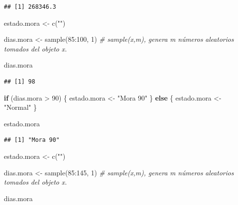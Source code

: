 \documentclass[
  12pt,
]{book}
\newenvironment{Shaded}{\begin{snugshade}}{\end{snugshade}}
\newcommand{\CommentTok}[1]{\textcolor[rgb]{0.56,0.35,0.01}{\textit{#1}}}
\newcommand{\ControlFlowTok}[1]{\textcolor[rgb]{0.13,0.29,0.53}{\textbf{#1}}}
\newcommand{\DecValTok}[1]{\textcolor[rgb]{0.00,0.00,0.81}{#1}}
\newcommand{\FunctionTok}[1]{\textcolor[rgb]{0.00,0.00,0.00}{#1}}
\newcommand{\NormalTok}[1]{#1}
\newcommand{\OtherTok}[1]{\textcolor[rgb]{0.56,0.35,0.01}{#1}}
\newcommand{\SpecialCharTok}[1]{\textcolor[rgb]{0.00,0.00,0.00}{#1}}
\newcommand{\StringTok}[1]{\textcolor[rgb]{0.31,0.60,0.02}{#1}}
\begin{document}
\begin{verbatim}
## [1] 268346.3
\end{verbatim}

\begin{Shaded}
\begin{Highlighting}[]
\NormalTok{estado.mora }\OtherTok{\textless{}{-}} \FunctionTok{c}\NormalTok{(}\StringTok{""}\NormalTok{)}

\NormalTok{dias.mora }\OtherTok{\textless{}{-}} \FunctionTok{sample}\NormalTok{(}\DecValTok{85}\SpecialCharTok{:}\DecValTok{100}\NormalTok{, }\DecValTok{1}\NormalTok{) }\CommentTok{\# sample(x,m), genera m números aleatorios tomados del objeto x.}

\NormalTok{dias.mora}
\end{Highlighting}
\end{Shaded}

\begin{verbatim}
## [1] 98
\end{verbatim}

\begin{Shaded}
\begin{Highlighting}[]
\ControlFlowTok{if}\NormalTok{ (dias.mora }\SpecialCharTok{\textgreater{}} \DecValTok{90}\NormalTok{) \{}
\NormalTok{  estado.mora }\OtherTok{\textless{}{-}} \StringTok{"Mora 90"}
\NormalTok{\} }\ControlFlowTok{else}\NormalTok{ \{}
\NormalTok{  estado.mora }\OtherTok{\textless{}{-}} \StringTok{"Normal"}
\NormalTok{\}}

\NormalTok{estado.mora}
\end{Highlighting}
\end{Shaded}

\begin{verbatim}
## [1] "Mora 90"
\end{verbatim}

\begin{Shaded}
\begin{Highlighting}[]
\NormalTok{estado.mora }\OtherTok{\textless{}{-}} \FunctionTok{c}\NormalTok{(}\StringTok{""}\NormalTok{)}

\NormalTok{dias.mora }\OtherTok{\textless{}{-}} \FunctionTok{sample}\NormalTok{(}\DecValTok{85}\SpecialCharTok{:}\DecValTok{145}\NormalTok{, }\DecValTok{1}\NormalTok{) }\CommentTok{\# sample(x,m), genera m números aleatorios tomados del objeto x.}

\NormalTok{dias.mora}
\end{Highlighting}
\end{Shaded}
\end{document}
